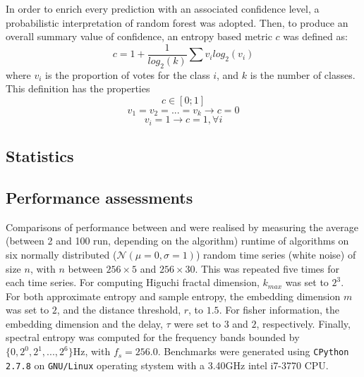 In order to enrich every prediction with an associated confidence level, a probabilistic interpretation of random forest was adopted\citationneeded{}.
Then, to produce an overall summary value of confidence, an entropy based metric $c$ was defined as:
\begin{equation}
c = 1 + \frac{1}{log_2(k)}\sum{v_i  log_2(v_i)}
\label{eq:entropy}
\end{equation}
where $v_i$ is the proportion of votes for the class $i$, and $k$ is the number of classes. This definition has the properties 
\[
c \in [0;1]
\]
\[
v_1 = v_2 = ... = v_k \rightarrow c = 0
\]
\[
v_i = 1 \rightarrow c = 1 , \forall i
\]


\subsection{Statistics}


\subsection{Performance assessments}
Comparisons of performance between \pr{} and \pyeeg{} were realised by measuring the average (between 2 and 100 run, depending on the algorithm) runtime of algorithms on six
normally distributed ($\mathcal{N}(\mu=0,\sigma=1)$) random time series (\ie white noise) of size $n$,
with $n$ between $256 \times{} 5$ and $256 \times{} 30$.
This was repeated five times for each time series.
For computing  Higuchi fractal dimension, $k_{max}$ was set to $2^3$.
For both approximate entropy and sample entropy, the embedding dimension $m$ was set to $2$, and the distance threshold, $r$, to $1.5$.
For fisher information, the embedding dimension and the delay, $\tau$ were set to $3$ and $2$, respectively.
Finally, spectral entropy was computed for the frequency bands bounded by $\{0, 2^0, 2^1, ..., 2^6\}$Hz, with $f_s = 256.0$.
Benchmarks were generated using \texttt{CPython 2.7.8} on \texttt{GNU/Linux} operating stystem with a 3.40GHz intel i7-3770 CPU.

